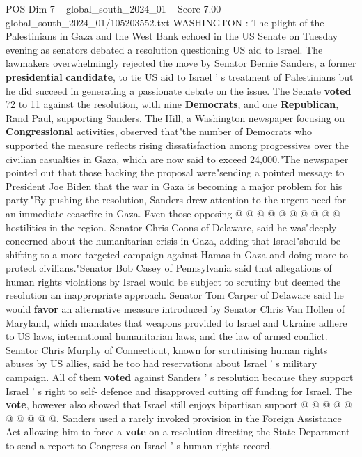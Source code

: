 \begin{textsample}{POS Dim 7 – global\_south\_2024\_01 – Score 7.00 – global\_south\_2024\_01/105203552.txt}  \label{ex:f7_pos_308}
WASHINGTON : The plight of the Palestinians in Gaza and the West Bank echoed in the US Senate on Tuesday evening as senators debated a resolution questioning US aid to Israel.
The lawmakers overwhelmingly rejected the move by Senator Bernie Sanders, a former \textbf{presidential} \textbf{candidate}, to tie US aid to Israel ' s treatment of Palestinians but he did succeed in generating a passionate debate on the issue.
The Senate \textbf{voted} 72 to 11 against the resolution, with nine \textbf{Democrats}, and one \textbf{Republican}, Rand Paul, supporting Sanders.
The Hill, a Washington newspaper focusing on \textbf{Congressional} activities, observed that"the number of Democrats who supported the measure reflects rising dissatisfaction among progressives over the civilian casualties in Gaza, which are now said to exceed 24,000."The newspaper pointed out that those backing the proposal were"sending a pointed message to President Joe Biden that the war in Gaza is becoming a major problem for his party."By pushing the resolution, Sanders drew attention to the urgent need for an immediate ceasefire in Gaza.
Even those opposing @ @ @ @ @ @ @ @ @ @ hostilities in the region.
Senator Chris Coons of Delaware, said he was"deeply concerned about the humanitarian crisis in Gaza, adding that Israel"should be shifting to a more targeted campaign against Hamas in Gaza and doing more to protect civilians."Senator Bob Casey of Pennsylvania said that allegations of human rights violations by Israel would be subject to scrutiny but deemed the resolution an inappropriate approach.
Senator Tom Carper of Delaware said he would \textbf{favor} an alternative measure introduced by Senator Chris Van Hollen of Maryland, which mandates that weapons provided to Israel and Ukraine adhere to US laws, international humanitarian laws, and the law of armed conflict.
Senator Chris Murphy of Connecticut, known for scrutinising human rights abuses by US allies, said he too had reservations about Israel ' s military campaign.
All of them \textbf{voted} against Sanders ' s resolution because they support Israel ' s right to self- defence and disapproved cutting off funding for Israel.
The \textbf{vote}, however also showed that Israel still enjoys bipartisan support @ @ @ @ @ @ @ @ @ @.
Sanders used a rarely invoked provision in the Foreign Assistance Act allowing him to force a \textbf{vote} on a resolution directing the State Department to send a report to Congress on Israel ' s human rights record.

\end{textsample}
